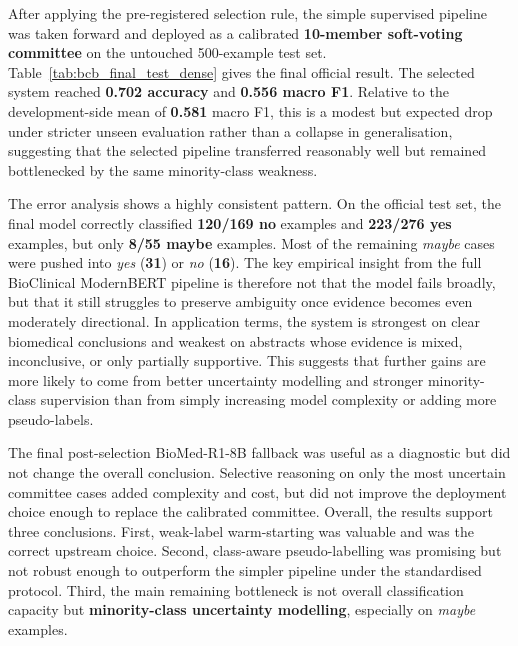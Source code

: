\documentclass{article}
\begin{document}
After applying the pre-registered selection rule, the simple supervised pipeline was taken forward and deployed as a calibrated \textbf{10-member soft-voting committee} on the untouched 500-example test set. Table~\ref{tab:bcb_final_test_dense} gives the final official result. The selected system reached \textbf{0.702 accuracy} and \textbf{0.556 macro F1}. Relative to the development-side mean of \textbf{0.581} macro F1, this is a modest but expected drop under stricter unseen evaluation rather than a collapse in generalisation, suggesting that the selected pipeline transferred reasonably well but remained bottlenecked by the same minority-class weakness.

\begin{table}[H]
\centering
\caption{Final official test result for the selected BioClinical ModernBERT system.}
\label{tab:bcb_final_test_dense}
\small
{}
\end{table}

The error analysis shows a highly consistent pattern. On the official test set, the final model correctly classified \textbf{120/169 no} examples and \textbf{223/276 yes} examples, but only \textbf{8/55 maybe} examples. Most of the remaining \textit{maybe} cases were pushed into \textit{yes} (\textbf{31}) or \textit{no} (\textbf{16}). The key empirical insight from the full BioClinical ModernBERT pipeline is therefore not that the model fails broadly, but that it still struggles to preserve ambiguity once evidence becomes even moderately directional. In application terms, the system is strongest on clear biomedical conclusions and weakest on abstracts whose evidence is mixed, inconclusive, or only partially supportive. This suggests that further gains are more likely to come from better uncertainty modelling and stronger minority-class supervision than from simply increasing model complexity or adding more pseudo-labels.

The final post-selection BioMed-R1-8B fallback was useful as a diagnostic but did not change the overall conclusion. Selective reasoning on only the most uncertain committee cases added complexity and cost, but did not improve the deployment choice enough to replace the calibrated committee. Overall, the results support three conclusions. First, weak-label warm-starting was valuable and was the correct upstream choice. Second, class-aware pseudo-labelling was promising but not robust enough to outperform the simpler pipeline under the standardised protocol. Third, the main remaining bottleneck is not overall classification capacity but \textbf{minority-class uncertainty modelling}, especially on \textit{maybe} examples.
\end{document}

